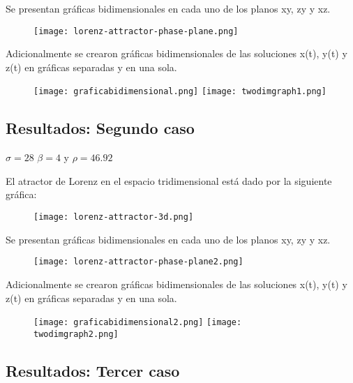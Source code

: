 \documentclass[a4paper]{article}
\begin{document}
\newpage

Se presentan gráficas bidimensionales en cada uno de los planos xy, zy y xz. 

\begin{figure}[ht!]
\centering
\texttt{[image: lorenz-attractor-phase-plane.png]}
\end{figure}

Adicionalmente se crearon gráficas bidimensionales de las soluciones x(t), y(t) y z(t) en gráficas separadas y en una sola.

\begin{figure}[ht!]
\centering
\texttt{[image: graficabidimensional.png]}
\texttt{[image: twodimgraph1.png]}
\end{figure}

\newpage

\subsection{Resultados: Segundo caso}

\begin{center}
$\sigma=28$ $\beta=4$ y $\rho=46.92$
\end{center}

El atractor de Lorenz en el espacio tridimensional está dado por la siguiente gráfica:

\begin{figure}[ht!]
\centering
\texttt{[image: lorenz-attractor-3d.png]}
\end{figure}

Se presentan gráficas bidimensionales en cada uno de los planos xy, zy y xz. 

\begin{figure}[ht!]
\centering
\texttt{[image: lorenz-attractor-phase-plane2.png]}
\end{figure}

Adicionalmente se crearon gráficas bidimensionales de las soluciones x(t), y(t) y z(t) en gráficas separadas y en una sola.

\begin{figure}[ht!]
\centering
\texttt{[image: graficabidimensional2.png]}
\texttt{[image: twodimgraph2.png]}
\end{figure}


\newpage

\subsection{Resultados: Tercer caso}
\end{document}
